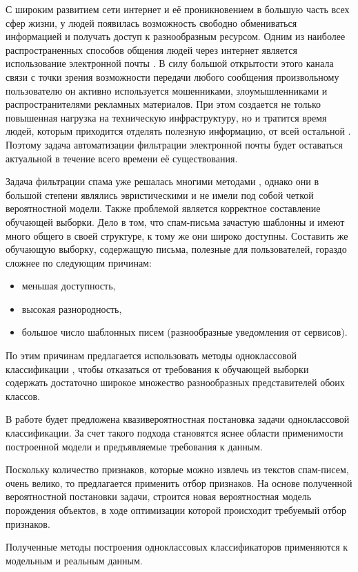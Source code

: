 С широким развитием сети интернет и её проникновением в большую часть всех сфер жизни, у людей появилась возможность свободно обмениваться информацией и получать доступ к разнообразным ресурсом. 
Одним из наиболее распространенных способов общения людей через интернет является использование электронной почты \cite{}. 
В силу большой открытости этого канала связи с точки зрения возможности передачи любого сообщения произвольному пользователю он активно используется мошенниками, злоумышленниками и распространителями рекламных материалов. При этом создается не только повышенная нагрузка на техническую инфраструктуру, но и тратится время людей, которым приходится отделять полезную информацию, от всей остальной \cite{}. 
Поэтому задача автоматизации фильтрации электронной почты будет оставаться актуальной в течение всего времени её существования.

Задача фильтрации спама уже решалась многими методами \cite{}, однако они в большой степени являлись эвристическими и не имели под собой четкой вероятностной модели. 
Также проблемой является корректное составление обучающей выборки. 
Дело в том, что спам-письма зачастую шаблонны и имеют много общего в своей структуре, к тому же они широко доступны. 
Составить же обучающую выборку, содержащую письма, полезные для пользователей, гораздо сложнее по следующим причинам:
\begin{itemize}
	\item меньшая доступность,
	\item высокая разнородность,
	\item большое число шаблонных писем (разнообразные уведомления от сервисов).
\end{itemize}
По этим причинам предлагается использовать методы одноклассовой классификации \cite{}, чтобы отказаться от требования к обучающей выборки содержать достаточно широкое множество разнообразных представителей обоих классов.

В работе будет предложена квазивероятностная постановка задачи одноклассовой классификации. 
За счет такого подхода становятся яснее области применимости построенной модели и предъявляемые требования к данным.

Поскольку количество признаков, которые можно извлечь из текстов спам-писем, очень велико, то предлагается применить отбор признаков. 
На основе полученной вероятностной постановки задачи, строится новая вероятностная модель порождения объектов, в ходе оптимизации которой происходит требуемый отбор признаков.

Полученные методы построения одноклассовых классификаторов применяются к модельным и реальным данным.

